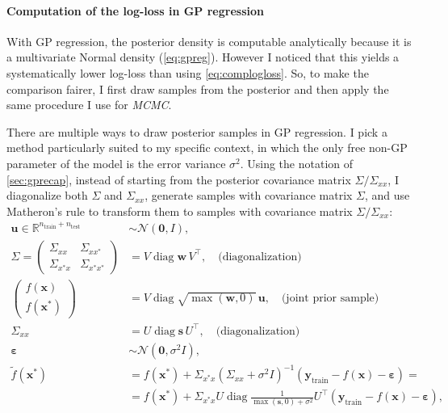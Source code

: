\documentclass[a4paper]{article}
\DeclareMathOperator{\diag}{diag}
\theoremstyle{definition}
\begin{document}
    \paragraph{Computation of the log-loss in GP regression}

    With GP regression, the posterior density is computable analytically because it is a multivariate Normal density (\autoref{eq:gpreg}). However I noticed that this yields a systematically lower log-loss than using \autoref{eq:complogloss}. So, to make the comparison fairer, I first draw samples from the posterior and then apply the same procedure I use for \emph{MCMC}.

    There are multiple ways to draw posterior samples in GP regression. I pick a method particularly suited to my specific context, in which the only free non-GP parameter of the model is the error variance $\sigma^2$. Using the notation of \autoref{sec:gprecap}, instead of starting from the posterior covariance matrix $\Sigma/\Sigma_{xx}$, I diagonalize both $\Sigma$ and $\Sigma_{xx}$, generate samples with covariance matrix $\Sigma$, and use Matheron's rule \autocite[72]{terenin2022} to transform them to samples with covariance matrix $\Sigma/\Sigma_{xx}$:
    \begin{align}
        \mathbf u \in \mathbb R^{n_\text{train} + n_\text{test}} &\sim
        \mathcal N(\mathbf 0, I), \\
        \Sigma = \begin{pmatrix}
            \Sigma_{xx} & \Sigma_{xx^*} \\
            \Sigma_{x^*x} & \Sigma_{x^*x^*}
        \end{pmatrix} &= V\diag\mathbf w\, V^\top, \quad\text{(diagonalization)} \\
        \begin{pmatrix}
            f(\mathbf x) \\ f(\mathbf x^*)
        \end{pmatrix}
        &= V\diag\sqrt{\max(\mathbf w, 0)}\, \mathbf u,\quad\text{(joint prior sample)} \\
        \Sigma_{xx} &= U\diag\mathbf s\, U^\top, \quad\text{(diagonalization)} \\
        \boldsymbol\varepsilon &\sim \mathcal N(\mathbf 0, \sigma^2 I), \\
        \tilde f(\mathbf x^*) &=
            f(\mathbf x^*) + \Sigma_{x^*x}(\Sigma_{xx} + \sigma^2I)^{-1}
            (\mathbf y_\text{train} - f(\mathbf x) - \boldsymbol\varepsilon) = \\
        &= f(\mathbf x^*) + \Sigma_{x^*x} U\diag\frac{1}{\max(\mathbf s, 0) + \sigma^2} U^\top
            (\mathbf y_\text{train} - f(\mathbf x) - \boldsymbol\varepsilon),
    \end{align}
\end{document}
